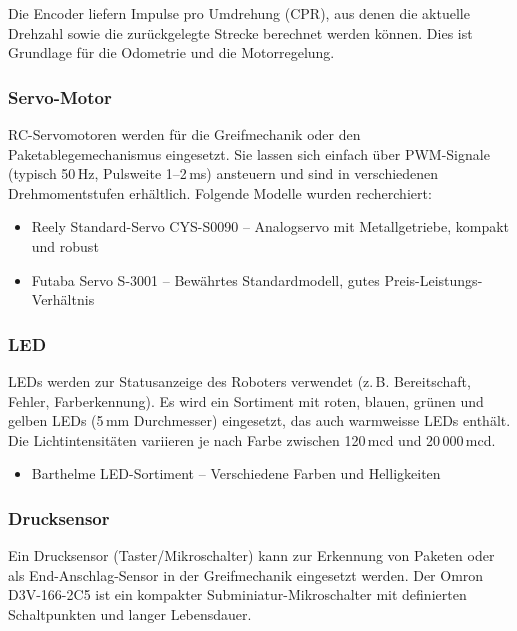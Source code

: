 \documentclass[12pt,a4paper]{article}
\begin{document}
	Die Encoder liefern Impulse pro Umdrehung (CPR), aus denen die aktuelle Drehzahl sowie die zurückgelegte Strecke berechnet werden können. Dies ist Grundlage für die Odometrie und die Motorregelung.
	
	\subsubsection{Servo-Motor}
	
	RC-Servomotoren werden für die Greifmechanik oder den Paketablegemechanismus eingesetzt. Sie lassen sich einfach über PWM-Signale (typisch 50\,Hz, Pulsweite 1--2\,ms) ansteuern und sind in verschiedenen Drehmomentstufen erhältlich. Folgende Modelle wurden recherchiert:
	
	\begin{itemize}
		\item Reely Standard-Servo CYS-S0090 \cite{conrad_servo_reely} -- Analogservo mit Metallgetriebe, kompakt und robust
		\item Futaba Servo S-3001 \cite{modellsport_futaba} -- Bewährtes Standardmodell, gutes Preis-Leistungs-Verhältnis
	\end{itemize}
	
	\subsubsection{LED}
	
	LEDs werden zur Statusanzeige des Roboters verwendet (z.\,B. Bereitschaft, Fehler, Farberkennung). Es wird ein Sortiment mit roten, blauen, grünen und gelben LEDs (5\,mm Durchmesser) eingesetzt, das auch warmweisse LEDs enthält. Die Lichtintensitäten variieren je nach Farbe zwischen 120\,mcd und 20\,000\,mcd.
	
	\begin{itemize}
		\item Barthelme LED-Sortiment \cite{conrad_led} -- Verschiedene Farben und Helligkeiten
	\end{itemize}
	
	\subsubsection{Drucksensor}
	
	Ein Drucksensor (Taster/Mikroschalter) kann zur Erkennung von Paketen oder als End-Anschlag-Sensor in der Greifmechanik eingesetzt werden. Der Omron D3V-166-2C5 ist ein kompakter Subminiatur-Mikroschalter mit definierten Schaltpunkten und langer Lebensdauer.
	
\end{document}
